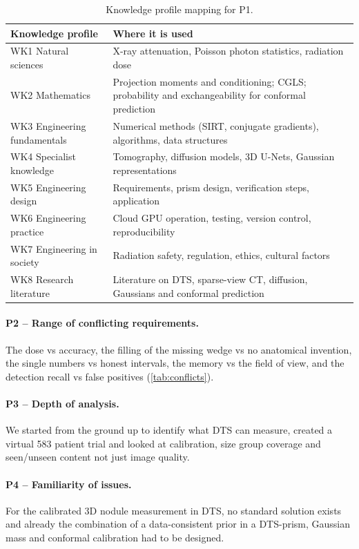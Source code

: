 \begin{table}[!htbp]
\centering\small
\caption{Knowledge profile mapping for P1.}
\label{tab:wk}
\begin{tabularx}{\linewidth}{>{\raggedright\arraybackslash}p{4.2cm} >{\raggedright\arraybackslash}X}
\toprule
Knowledge profile & Where it is used \\
\midrule
WK1 Natural sciences & X-ray attenuation, Poisson photon statistics, radiation dose \\
WK2 Mathematics & Projection moments and conditioning; CGLS; probability and exchangeability for conformal prediction \\
WK3 Engineering fundamentals & Numerical methods (SIRT, conjugate gradients), algorithms, data structures \\
WK4 Specialist knowledge & Tomography, diffusion models, 3D U-Nets, Gaussian representations \\
WK5 Engineering design & Requirements, prism design, verification steps, application \\
WK6 Engineering practice & Cloud GPU operation, testing, version control, reproducibility \\
WK7 Engineering in society & Radiation safety, regulation, ethics, cultural factors \\
WK8 Research literature & Literature on DTS, sparse-view CT, diffusion, Gaussians and conformal prediction \\
\bottomrule
\end{tabularx}
\end{table}

\paragraph{P2 -- Range of conflicting requirements.} The dose vs accuracy, the filling of the missing wedge vs no anatomical invention, the single numbers vs honest intervals, the memory vs the field of view, and the detection recall vs false positives (\cref{tab:conflicts}).

\paragraph{P3 -- Depth of analysis.} We started from the ground up to identify what DTS can measure, created a virtual 583 patient trial and looked at calibration, size group coverage and seen/unseen content not just image quality.

\paragraph{P4 -- Familiarity of issues.} For the calibrated 3D nodule measurement in DTS, no standard solution exists and already the combination of a data-consistent prior in a DTS-prism, Gaussian mass and conformal calibration had to be designed.


